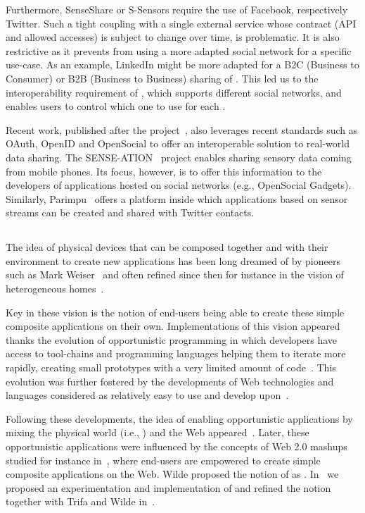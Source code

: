 Furthermore, SenseShare or S-Sensors require the use of Facebook, respectively Twitter. Such a tight coupling with a single external service whose contract (API and allowed accesses) is subject to change over time, is problematic. It is also restrictive as it prevents from using a more adapted social network for a specific use-case. As an example, LinkedIn might be more adapted for a B2C (Business to Consumer) or B2B (Business to Business) sharing of \sts{}. This led us to the interoperability requirement of \sac{}, which supports different social networks, and enables users to control which one to use for each \st{}. 

Recent work, published after the \sac{} project~\cite{Guinard2010-sharing}, also leverages recent standards such as OAuth, OpenID and OpenSocial to offer an interoperable solution to real-world data sharing. The SENSE-ATION~\cite{Shirazi2010} project enables sharing sensory data coming from mobile phones. Its focus, however, is to offer this information to the developers of applications hosted on social networks (e.g., OpenSocial Gadgets). Similarly, Parimpu~\cite{Pintus2011} offers a platform inside which applications based on sensor streams can be created and shared with Twitter contacts.

\subsection{\compoLayer{}}
The idea of physical devices that can be composed together and with their environment to create new applications has been long dreamed of by pioneers such as Mark Weiser~\cite{Weiser1991} and often refined since then for instance in the vision of heterogeneous homes~\cite{Aipperspach2009}.

Key in these vision is the notion of end-users being able to create these simple composite applications on their own. Implementations of this vision appeared thanks the evolution of opportunistic programming in which developers have access to tool-chains and programming languages helping them to iterate more rapidly, creating small prototypes with a very limited amount of code~\cite{Brandt2009,Hartmann2008}. This evolution was further fostered by the developments of Web technologies and languages considered as relatively easy to use and develop upon~\cite{Roelands2011}. 

Following these developments, the idea of enabling opportunistic applications by mixing the physical world (i.e., \sts{}) and the Web appeared~\cite{Kindberg2002}. Later, these opportunistic applications were influenced by the concepts of Web 2.0 mashups studied for instance in~\cite{Yee2008,Yu2008a}, where end-users are empowered to create simple composite applications on the Web. Wilde proposed the notion of \important{\pMashups{}} as . In~\cite{Guinard2009} we proposed an experimentation and implementation of \pMashups{} and refined the notion together with Trifa and Wilde in~\cite{Guinard2010-WoT}.

